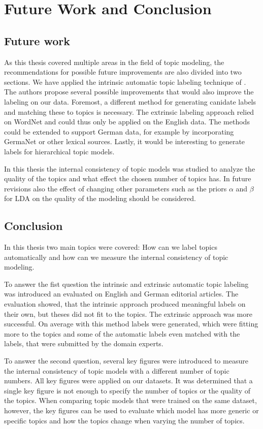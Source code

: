 \chapter{Future Work and Conclusion}
\label{future_work}

\section{Future work}
As this thesis covered multiple areas in the field of topic modeling, the recommendations for possible future improvements are also divided into two sections. We have applied the intrinsic automatic topic labeling technique of \cite{Mei2007}. The authors propose several possible improvements that would also improve the labeling on our data. Foremost, a different method for generating canidate labels and matching these to topics is necessary. The extrinsic labeling approach relied on WordNet and could thus only be applied on the English data. The methods could be extended to support German data, for example by incorporating GermaNet or other lexical sources. Lastly, it would be interesting to generate labels for hierarchical topic models.

In this thesis the internal consistency of topic models was studied to analyze the quality of the topics and what effect the chosen number of topics has. In future revisions also the effect of changing other parameters such as the priors $\alpha$ and $\beta$ for LDA on the quality of the modeling should be considered.

\section{Conclusion}
In this thesis two main topics were covered: How can we label topics automatically and how can we measure the internal consistency of topic modeling. 

To answer the fist question the intrinsic and extrinsic automatic topic labeling was introduced an evaluated on English and German editorial articles. The evaluation showed, that the intrinsic approach produced meaningful labels on their own, but theses did not fit to the topics. The extrinsic approach was more successful.
On average with this method labels were generated, which were fitting more to the topics and some of the automatic labels even matched with the labels, that were submitted by the domain experts. 

To answer the second question, several key figures were introduced to measure the internal consistency of topic models with a different number of topic numbers. All key figures were applied on our datasets. It was determined that a single key figure is not enough to specify the number of topics or the quality of the topics. When comparing topic models that were trained on the same dataset, however, the key figures can be used to evaluate which model has more generic or specific topics and how the topics change when varying the number of topics.
